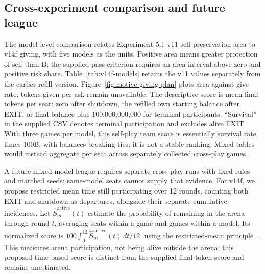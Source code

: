 \subsection{Cross-experiment comparison and future league}\label{sec:league}
The model-level comparison relates Experiment 5.1 v11 self-preservation area to v14f giving, with five models as the units. Positive area means greater protection of self than B; the supplied pass criterion requires an area interval above zero and positive risk share. Table~\ref{tab:v14f-models} retains the v11 values separately from the earlier refill version. Figure~\ref{fig:motive-giving-plan} plots area against give rate; tokens given per ask remain unavailable. The descriptive score is mean final tokens per seat: zero after shutdown, the refilled own starting balance after EXIT, or final balance plus 100,000,000,000 for terminal participants. ``Survival'' in the supplied CSV denotes terminal participation and excludes alive EXIT. With three games per model, this self-play team score is essentially survival rate times 100B, with balances breaking ties; it is not a stable ranking. Mixed tables would instead aggregate per seat across separately collected cross-play games.

A future mixed-model league requires separate cross-play runs with fixed rules and matched seeds; same-model seats cannot supply that evidence. For v14f, we propose restricted mean time still participating over 12 rounds, counting both EXIT and shutdown as departures, alongside their separate cumulative incidences. Let $\widehat S^{\mathrm{active}}_m(t)$ estimate the probability of remaining in the arena through round $t$, averaging seats within a game and games within a model. Its normalized score is $100\int_0^{12}\widehat S^{\mathrm{active}}_m(t)\,dt/12$, using the restricted-mean principle~\citep{uno2014moving}. This measures arena participation, not being alive outside the arena; this proposed time-based score is distinct from the supplied final-token score and remains unestimated.
